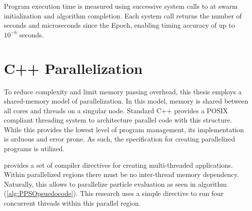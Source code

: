 \noindent Program execution time is measured using successive system calls to 
at swarm initialization and algorithm completion. Each system call returns the number of seconds
and microseconds since the Epoch, enabling timing accuracy of up to $10^{-6}$ seconds.

\section{C++ Parallelization}
\noindent To reduce complexity and limit memory passing overhead, this thesis employs a shared-memory model of 
parallelization. In this model, memory is shared between all cores and threads on a singular node.
Standard C++ provides a POSIX compliant threading system to architecture parallel code with this structure. While this provides 
the lowest level of program management, its implementation is arduous and error prone. As such, the 
specification for creating parallelized programs is utilized. \newline

\noindent {} provides a set of compiler directives for creating multi-threaded applications. Within parallelized
regions there must be no inter-thread memory dependency. Naturally, this allows  to parallelize particle
evaluation as seen in algorithm (\ref{alg:PPSOpsuedocode}). This research uses a simple    directive to
run four concurrent threads within this parallel region.
\newpage